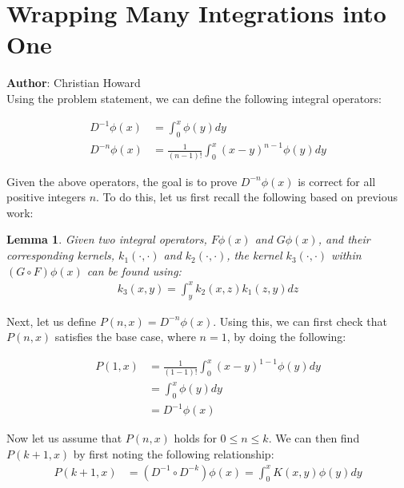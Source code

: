 \documentclass{article}[11pt]
\author{Christian Howard}
\newtheorem{lemma}{Lemma}[section]
\begin{document}
   
   \section{Wrapping Many Integrations into One}
   \textbf{Author}: Christian Howard \\
   Using the problem statement, we can define the following integral operators:
   
   \begin{align}
   D^{-1} \phi (x) &= \int_0^x \phi(y) dy \\
   D^{-n} \phi (x) &= \frac{1}{(n-1)!}\int_0^x (x-y)^{n-1}\phi(y) dy 
   \end{align}
   
   Given the above operators, the goal is to prove $D^{-n} \phi (x)$ is correct for all positive integers $n$. To do this, let us first recall the following based on previous work:
   
   \begin{lemma} \label{l1}
   Given two integral operators, $F\phi(x)$ and $G\phi(x)$, and their corresponding kernels, $k_1(\cdot,\cdot)$ and $k_2(\cdot,\cdot)$, the kernel $k_3(\cdot,\cdot)$ within $(G \circ F)\phi(x)$ can be found using:
	   \begin{align*}
	   k_3(x,y) = \int_y^x k_2(x,z) k_1(z,y) dz 
	   \end{align*}
   \end{lemma}
   
   Next, let us define $P(n,x) = D^{-n}\phi(x)$. Using this, we can first check that $P(n,x)$ satisfies the base case, where $n=1$, by doing the following:
   
   \begin{align*}
   P(1,x) &= \frac{1}{(1-1)!}\int_0^x (x-y)^{1-1}\phi(y) dy \\
   &= \int_0^x \phi(y) dy \\
   &= D^{-1}\phi(x)
   \end{align*}
   
   Now let us assume that $P(n,x)$ holds for $0 \leq n \leq k$. We can then find $P(k+1,x)$ by first noting the following relationship:
   \begin{align*}
   P(k+1,x) &= (D^{-1} \circ D^{-k})\phi(x) = \int_0^x K(x,y) \phi(y) dy
   \end{align*}
   
\end{document}
